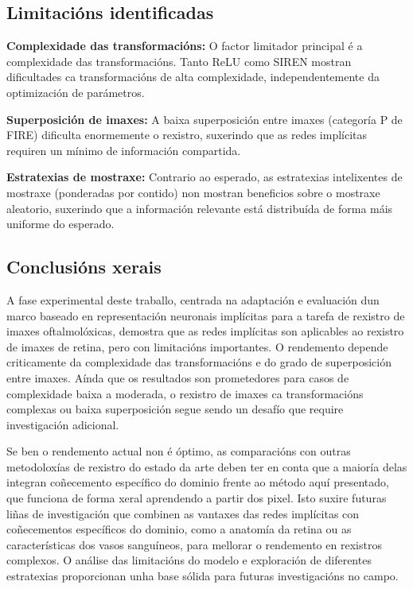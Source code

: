 \subsection{Limitacións identificadas}
\label{subsec:Limitacións identificadas}

\textbf{Complexidade das transformacións:} O factor limitador principal é a complexidade das transformacións. Tanto ReLU como SIREN mostran dificultades ca transformacións de alta complexidade, independentemente da optimización de parámetros.

\textbf{Superposición de imaxes:} A baixa superposición entre imaxes (categoría P de FIRE) dificulta enormemente o rexistro, suxerindo que as redes implícitas requiren un mínimo de información compartida.

\textbf{Estratexias de mostraxe:} Contrario ao esperado, as estratexias intelixentes de mostraxe (ponderadas por contido) non mostran beneficios sobre o mostraxe aleatorio, suxerindo que a información relevante está distribuída de forma máis uniforme do esperado.

\subsection{Conclusións xerais}
\label{subsec:Conclusións xerais}

A fase experimental deste traballo, centrada na adaptación e evaluación dun marco baseado en representación neuronais implícitas para a tarefa de rexistro de imaxes oftalmolóxicas,
demostra que as redes implícitas son aplicables ao rexistro de imaxes de retina, pero con limitacións importantes.
 O rendemento depende criticamente da complexidade das transformacións e do grado de superposición entre imaxes. Aínda que os resultados son prometedores para casos de complexidade baixa a moderada, o rexistro de imaxes ca transformacións complexas ou baixa superposición segue sendo un desafío que require investigación adicional.

Se ben o rendemento actual non é óptimo, as comparacións con outras metodoloxías de rexistro do estado da arte deben ter en conta que a maioría delas integran coñecemento específico do dominio frente ao método aquí presentado, que funciona de forma xeral aprendendo a partir dos pixel.
Isto suxire futuras liñas de investigación que combinen as vantaxes das redes implícitas con coñecementos específicos do dominio, como a anatomía da retina ou as características dos vasos sanguíneos, para mellorar o rendemento en rexistros complexos.
O análise das limitacións do modelo e exploración de diferentes estratexias proporcionan unha base sólida para futuras investigacións no campo. 